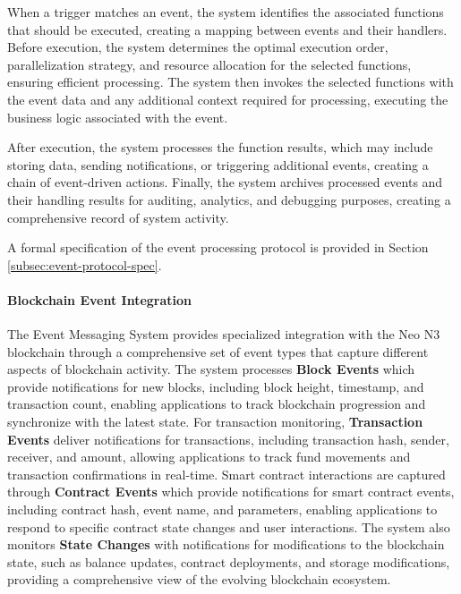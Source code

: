 \documentclass[11pt]{article}
\begin{document}
When a trigger matches an event, the system identifies the associated functions that should be executed, creating a mapping between events and their handlers. Before execution, the system determines the optimal execution order, parallelization strategy, and resource allocation for the selected functions, ensuring efficient processing. The system then invokes the selected functions with the event data and any additional context required for processing, executing the business logic associated with the event.

After execution, the system processes the function results, which may include storing data, sending notifications, or triggering additional events, creating a chain of event-driven actions. Finally, the system archives processed events and their handling results for auditing, analytics, and debugging purposes, creating a comprehensive record of system activity.

A formal specification of the event processing protocol is provided in Section \ref{subsec:event-protocol-spec}.



\paragraph{Blockchain Event Integration}
The Event Messaging System provides specialized integration with the Neo N3 blockchain through a comprehensive set of event types that capture different aspects of blockchain activity. The system processes \textbf{Block Events} which provide notifications for new blocks, including block height, timestamp, and transaction count, enabling applications to track blockchain progression and synchronize with the latest state. For transaction monitoring, \textbf{Transaction Events} deliver notifications for transactions, including transaction hash, sender, receiver, and amount, allowing applications to track fund movements and transaction confirmations in real-time. Smart contract interactions are captured through \textbf{Contract Events} which provide notifications for smart contract events, including contract hash, event name, and parameters, enabling applications to respond to specific contract state changes and user interactions. The system also monitors \textbf{State Changes} with notifications for modifications to the blockchain state, such as balance updates, contract deployments, and storage modifications, providing a comprehensive view of the evolving blockchain ecosystem.
\end{document}
